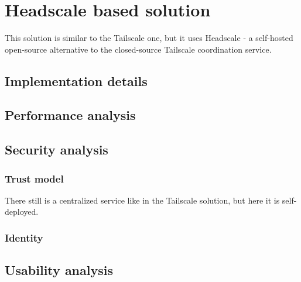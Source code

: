\hypertarget{thesis__080-headscale.md}{}
\hypertarget{thesis__080-headscale.md__headscale-based-solution}{%
\chapter{Headscale based
solution}\label{thesis__080-headscale.md__headscale-based-solution}}

This solution is similar to the Tailscale one, but it uses Headscale - a
self-hosted open-source alternative to the closed-source Tailscale
coordination service.

\hypertarget{thesis__080-headscale.md__implementation-details}{%
\section{Implementation
details}\label{thesis__080-headscale.md__implementation-details}}

\hypertarget{thesis__080-headscale.md__performance-analysis}{%
\section{Performance
analysis}\label{thesis__080-headscale.md__performance-analysis}}

\hypertarget{thesis__080-headscale.md__security-analysis}{%
\section{Security
analysis}\label{thesis__080-headscale.md__security-analysis}}

\hypertarget{thesis__080-headscale.md__trust-model}{%
\subsection{Trust model}\label{thesis__080-headscale.md__trust-model}}

There still is a centralized service like in the Tailscale solution, but
here it is self-deployed.

\hypertarget{thesis__080-headscale.md__identity}{%
\subsection{Identity}\label{thesis__080-headscale.md__identity}}

\hypertarget{thesis__080-headscale.md__usability-analysis}{%
\section{Usability
analysis}\label{thesis__080-headscale.md__usability-analysis}}
